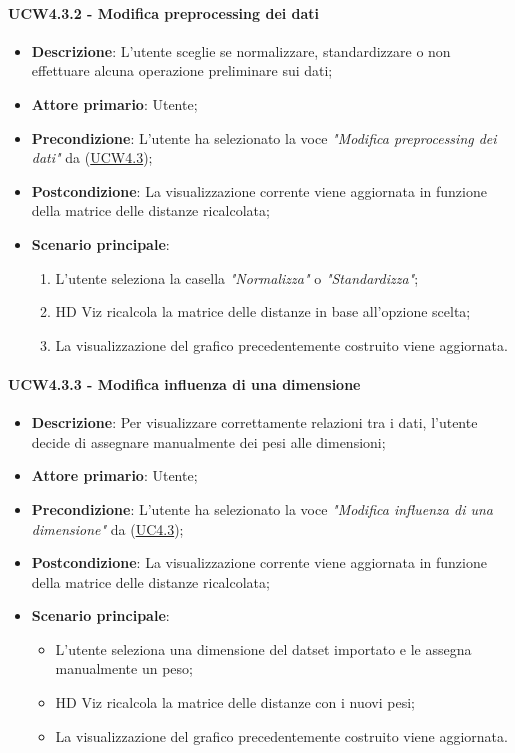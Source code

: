 \paragraph{UCW4.3.2 - Modifica preprocessing dei dati}
\label{par:ucw4.3.2}
\begin{itemize}
    \item \textbf{Descrizione}: L’utente sceglie se normalizzare, standardizzare o non effettuare alcuna operazione preliminare sui dati;

    \item \textbf{Attore primario}: Utente;
    \item \textbf{Precondizione}: L'utente ha selezionato la voce \emph{"Modifica preprocessing dei dati"} da (\hyperref[ssub:ucw4.3]{UCW4.3});
    \item \textbf{Postcondizione}: La visualizzazione corrente viene aggiornata in funzione della matrice delle distanze ricalcolata;
    \item \textbf{Scenario principale}:
    \begin{enumerate}
        \item L'utente seleziona la casella \emph{"Normalizza"} o \emph{"Standardizza"};
        \item HD Viz ricalcola la matrice delle distanze in base all'opzione scelta;
        \item La visualizzazione del grafico precedentemente costruito viene aggiornata.
    \end{enumerate}
\end{itemize}

\paragraph{UCW4.3.3 - Modifica influenza di una dimensione}
\label{par:ucw4.3.3}
\begin{itemize}
    \item \textbf{Descrizione}: Per visualizzare correttamente relazioni tra i dati,
                                l’utente decide di assegnare manualmente dei pesi alle dimensioni;

    \item \textbf{Attore primario}: Utente;
    \item \textbf{Precondizione}: L'utente ha selezionato la voce \emph{"Modifica influenza di una dimensione"} da (\hyperref[ssub:uc4.3]{UC4.3});

    \item \textbf{Postcondizione}: La visualizzazione corrente viene aggiornata in funzione della matrice delle distanze ricalcolata;
    \item \textbf{Scenario principale}:
    \begin{itemize}
        \item L’utente seleziona una dimensione del datset importato e le assegna manualmente un peso;
        \item HD Viz ricalcola la matrice delle distanze con i nuovi pesi;
        \item La visualizzazione del grafico precedentemente costruito viene aggiornata.
    \end{itemize}
\end{itemize}

